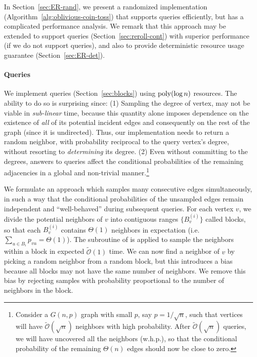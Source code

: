 In Section~\ref{sec:ER-rand}, we present a randomized implementation (Algorithm~\ref{alg:oblivious-coin-toss})
that supports  queries efficiently, but has a complicated performance analysis.
We remark that this approach may be extended to support  queries (Section~\ref{sec:reroll-cont}) with superior performance
(if we do not support  queries),
and also to provide deterministic resource usage guarantee (Section~\ref{sec:ER-det}).


\paragraph*{ Queries}
\label{par:random_neighbor_queries}
We implement  queries (Section~\ref{sec:blocks}) using $\mathrm{poly}(\log n)$ resources.
The ability to do so is surprising since:
(1) Sampling the degree of vertex, may not be viable in \emph{sub-linear} time, because this quantity alone
imposes dependence on the existence of \emph{all} of its potential incident edges and consequently on the rest of the graph (since it is undirected).
Thus, our implementation needs to return a random neighbor, with probability reciprocal to the query vertex's degree,
without resorting to \emph{determining} its degree.
(2) Even without committing to the degrees, answers to  queries
affect the conditional probabilities of the remaining adjacencies in a global and non-trivial manner.\footnote{
\label{conditional} Consider a $G(n,p)$ graph with small $p$, say $p = 1/\sqrt n$,
such that vertices will have $\tilde{\mathcal{O}}(\sqrt n)$ neighbors with high probability.
After $\tilde{\mathcal{O}}(\sqrt n)$  queries, we will have uncovered all the neighbors (w.h.p.),
so that the conditional probability of the remaining $\Theta(n)$ edges should now be close to zero.}

We formulate an approach which samples many consecutive edges simultaneously,
in such a way that the conditional probabilities of the unsampled edges remain independent and ``well-behaved'' during subsequent queries.
For each vertex $v$, we divide the potential neighbors of $v$ into contiguous ranges $\{B^{(i)}_v\}$ called blocks,
so that each $B^{(i)}_v$ contains $\Theta(1)$ neighbors in expectation (i.e. $\sum_{u\in B_i} p_{vu} = \Theta(1)$).
The subroutine of  is applied to sample the neighbors within a block in expected $\mathcal{\widetilde O}(1)$ time.
We can now find a neighbor of $v$ by picking a random neighbor from a random block,
but this introduces a bias because all blocks may not have the same number of neighbors.
We remove this bias by rejecting samples with probability proportional to the number of neighbors in the block.




